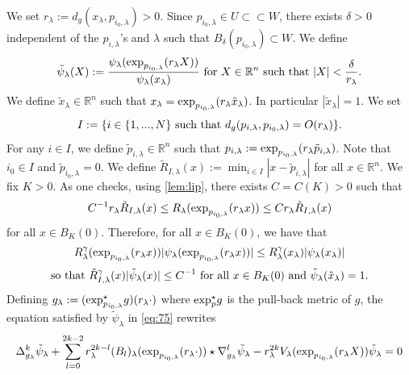 \documentclass[reqno]{amsart}
\def \rn {\mathbb{R}^n}
\def \tpl {\tilde{\psi}_\lambda}
\begin{document}
\medskip{} We set $r_\lambda:=d_g(x_\lambda,p_{i_0,\lambda})>0$.  Since $p_{i_0,\lambda}\in U\subset\subset W$, there exists $\delta>0$ independent of the $p_{i,\lambda}$'s and $\lambda$ such that $B_\delta(p_{i_0,\lambda})\subset W$. We define
\begin{equation*}
\tilde{\psi}_\lambda(X):=\frac{\psi_\lambda(\hbox{exp}_{p_{i_0,\lambda}}(r_\lambda X))}{\psi_\lambda(x_\lambda)}\hbox{ for }X\in\rn \hbox{ such that }|X|<\frac{\delta}{r_\lambda}.
\end{equation*}
We define $\tilde{x}_\lambda\in \rn$ such that $x_\lambda=\hbox{exp}_{p_{i_0,\lambda}}(r_\lambda \tilde{x}_\lambda)$. In particular $|\tilde{x}_\lambda|=1$. We set
$$I:=\{i\in \{1,...,N\}\hbox{ such that }d_g(p_{i,\lambda},p_{i_0,\lambda})=O(r_\lambda)\}.$$
For any $i\in I$, we define $\tilde{p}_{i,\lambda}\in\rn$ such that $p_{i,\lambda}:=\hbox{exp}_{p_{i_0,\lambda}}(r_\lambda \tilde{p}_{i,\lambda})$. Note that  $i_0\in I$ and $\tilde{p}_{i_0,\lambda}=0$. We define $\tilde{R}_{I,\lambda}(x):=\min_{i\in I}|x-\tilde{p}_{i,\lambda}|$ for all $x\in \rn$. We fix $K>0$. As one checks, using \eqref{lem:lip}, there exists $C=C(K)>0$ such that
\begin{equation}\label{ineq:R}
C^{-1} r_\lambda \tilde{R}_{I,\lambda}(x)\leq R_\lambda( \hbox{exp}_{p_{i_0,\lambda}}(r_\lambda x))\leq C r_\lambda \tilde{R}_{I,\lambda}(x)
\end{equation}
for all $x\in B_K(0)$. Therefore, for all $x\in B_K(0)$, we have that
\begin{eqnarray*}
R_\lambda^\gamma ( \hbox{exp}_{p_{i_0,\lambda}}(r_\lambda x))|\psi_\lambda(\hbox{exp}_{p_{i_0,\lambda}}(r_\lambda x))|\leq R_\lambda^\gamma(x_\lambda) |\psi_\lambda(x_\lambda)|
\end{eqnarray*}
\begin{equation}\label{bnd:tpl}
\hbox{so that }\tilde{R}_{I,\lambda}^\gamma(x) |\tpl(x)|\leq C^{-1}\hbox{ for all }x\in B_K(0) \hbox{ and }\tpl(\tilde{x}_\lambda)=1.
\end{equation}
Defining $g_\lambda:=(\hbox{exp}_{p_{i_0,\lambda}}^\star g)(r_\lambda\cdot)$ where $\hbox{exp}_{p }^\star g$ is the pull-back metric of $g$, the equation satisfied by $\tpl$ in \eqref{eq:75} rewrites
\begin{equation}\label{eq:tpl:bis}
\Delta_{g_\lambda}^k\tpl+\sum_{l=0}^{2k-2}r_\lambda^{2k-l}(B_l)_{\lambda}(\hbox{exp}_{p_{i_0,\lambda}}(r_\lambda \cdot))\star\nabla_{g_\lambda}^l\tpl-r_\lambda^{2k}V_\lambda(\hbox{exp}_{p_{i_0,\lambda}}(r_\lambda X))\tpl=0
\end{equation}
\end{document}
